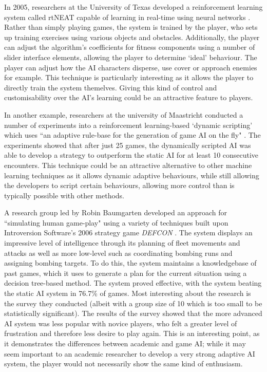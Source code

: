 \documentclass[a4paper,oneside]{report}
\begin{document}
In 2005, researchers at the University of Texas developed a reinforcement learning system called rtNEAT capable of learning in real-time using neural networks \cite{Stanley:2005ff}. Rather than simply playing games, the system is trained by the player, who sets up training exercises using various objects and obstacles. Additionally, the player can adjust the algorithm's coefficients for fitness components using a number of slider interface elements, allowing the player to determine `ideal' behaviour. The player can adjust how the AI characters disperse, use cover or approach enemies for example. This technique is particularly interesting as it allows the player to directly train the system themelves. Giving this kind of control and customisability over the AI's learning could be an attractive feature to players. 

In another example, researchers at the university of Maastricht conducted a number of experiments into a reinforcement learning-based `dynamic scripting' which uses ``an adaptive rule-base for the generation of game AI on the fly" \cite{Spronck:2005fu}. The experiments showed that after just 25 games, the dynamically scripted AI was able to develop a strategy to outperform the static AI for at least 10 consecutive encounters. This technique could be an attractive alternative to other machine learning techniques as it allows dynamic adaptive behaviours, while still allowing the developers to script certain behaviours, allowing more control than is typically possible with other methods.

A research group led by Robin Baumgarten developed an approach for ``simulating human game-play" using a variety of techniques built upon Introversion Software's 2006 strategy game \emph{DEFCON} \cite{Baumgarten:2008il}. The system displays an impressive level of intelligence through its planning of fleet movements and attacks as well as more low-level such as coordinating bombing runs and assigning bombing targets. To do this, the system maintains a knowledgebase of past games, which it uses to generate a plan for the current situation using a decision tree-based method. The system proved effective, with the system beating the static AI system in 76.7\% of games. Most interesting about the research is the survey they conducted (albeit with a group size of 10 which is too small to be statistically significant). The results of the survey showed that the more advanced AI system was less popular with novice players, who felt a greater level of frustration and therefore less desire to play again. This is an interesting point, as it demonstrates the differences between academic and game AI; while it may seem important to an academic researcher to develop a very strong adaptive AI system, the player would not necessarily show the same kind of enthusiasm.
\end{document}
